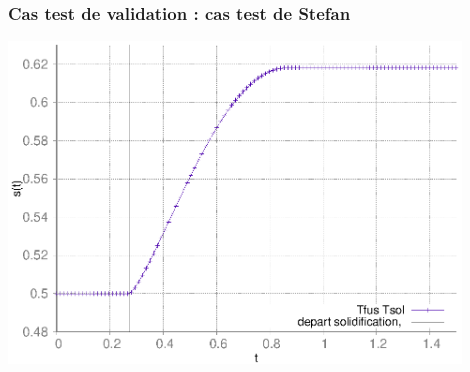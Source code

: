 \documentclass{beamer}
\begin{document}
\begin{frame}
    \frametitle{Cas test de validation : cas test de Stefan}
	\scriptsize
	
	\begin{center}

\includegraphics[width=0.9\textwidth]{Figures/StefanTFusTSol.eps}
\end{center}
	\end{frame}
\end{document}
